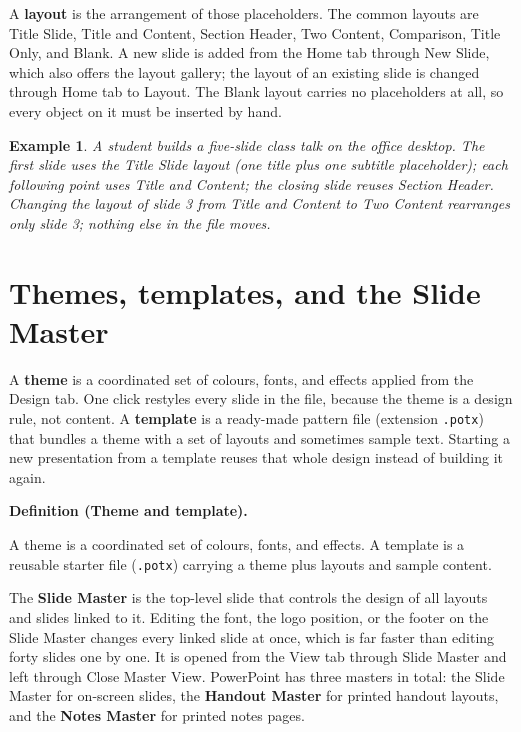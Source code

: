 \documentclass[11pt]{article}
\newtheorem{example}{Example}[section]
\newenvironment{definitionbox}[1]{%
  \par\noindent\textbf{Definition (#1).}\ \itshape
}{\par\vspace{0.3em}}
\begin{document}
A \textbf{layout} is the arrangement of those placeholders. The common layouts
are Title Slide, Title and Content, Section Header, Two Content, Comparison,
Title Only, and Blank. A new slide is added from the Home tab through New
Slide, which also offers the layout gallery; the layout of an existing slide
is changed through Home tab to Layout. The Blank layout carries no
placeholders at all, so every object on it must be inserted by hand.

\begin{example}
A student builds a five-slide class talk on the office desktop. The first
slide uses the Title Slide layout (one title plus one subtitle placeholder);
each following point uses Title and Content; the closing slide reuses Section
Header. Changing the layout of slide 3 from Title and Content to Two Content
rearranges only slide 3; nothing else in the file moves.
\end{example}

\section{Themes, templates, and the Slide Master}
A \textbf{theme} is a coordinated set of colours, fonts, and effects applied
from the Design tab. One click restyles every slide in the file, because the
theme is a design rule, not content. A \textbf{template} is a ready-made
pattern file (extension \texttt{.potx}) that bundles a theme with a set of
layouts and sometimes sample text. Starting a new presentation from a template
reuses that whole design instead of building it again.

\begin{definitionbox}{Theme and template}
A theme is a coordinated set of colours, fonts, and effects. A template is a
reusable starter file (\texttt{.potx}) carrying a theme plus layouts and
sample content.
\end{definitionbox}

The \textbf{Slide Master} is the top-level slide that controls the design of
all layouts and slides linked to it. Editing the font, the logo position, or
the footer on the Slide Master changes every linked slide at once, which is
far faster than editing forty slides one by one. It is opened from the View
tab through Slide Master and left through Close Master View. PowerPoint has
three masters in total: the Slide Master for on-screen slides, the
\textbf{Handout Master} for printed handout layouts, and the \textbf{Notes
Master} for printed notes pages.
\end{document}
